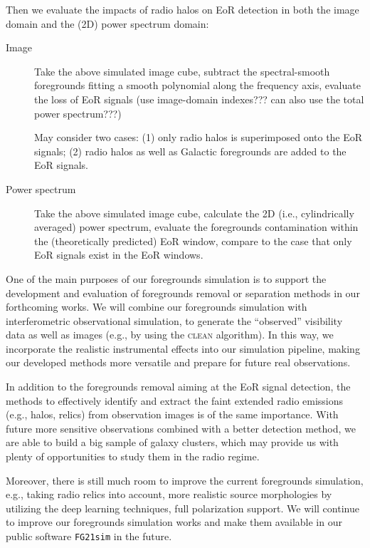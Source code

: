 \documentclass[modern]{aastex62}
\begin{document}
Then we evaluate the impacts of radio halos on EoR detection in both the
image domain and the (2D) power spectrum domain:
\begin{description}
  \item[Image]
    Take the above simulated image cube, subtract the spectral-smooth
    foregrounds fitting a smooth polynomial along the frequency axis,
    evaluate the loss of EoR signals (use image-domain indexes???
    can also use the total power spectrum???)

    May consider two cases: (1) only radio halos is superimposed onto the
    EoR signals; (2) radio halos as well as Galactic foregrounds are
    added to the EoR signals.

  \item[Power spectrum]
    Take the above simulated image cube, calculate the 2D
    (i.e., cylindrically averaged) power spectrum, evaluate the foregrounds
    contamination within the (theoretically predicted) EoR window,
    compare to the case that only EoR signals exist in the EoR windows.
\end{description}


One of the main purposes of our foregrounds simulation is to support
the development and evaluation of foregrounds removal or separation
methods in our forthcoming works.
We will combine our foregrounds simulation with interferometric
observational simulation, to generate the \enquote{observed} visibility
data as well as images (e.g., by using the \textsc{clean} algorithm).
In this way, we incorporate the realistic instrumental effects into
our simulation pipeline, making our developed methods more versatile
and prepare for future real observations.

In addition to the foregrounds removal aiming at the EoR signal
detection, the methods to effectively identify and extract the faint
extended radio emissions (e.g., halos, relics) from observation images
is of the same importance.
With future more sensitive observations combined with a better detection
method, we are able to build a big sample of galaxy clusters, which
may provide us with plenty of opportunities to study them in the radio
regime.

Moreover, there is still much room to improve the current foregrounds
simulation, e.g., taking radio relics into account, more realistic
source morphologies by utilizing the deep learning techniques,
full polarization support.
We will continue to improve our foregrounds simulation works and make
them available in our public software \texttt{FG21sim} in the future.
\end{document}
